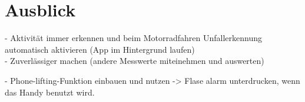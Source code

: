 \chapter{Ausblick}
- Aktivität immer erkennen und beim Motorradfahren Unfallerkennung automatisch aktivieren (App im Hintergrund laufen)\\

- Zuverlässiger machen (andere Messwerte miteinehmen und auswerten)

- Phone-lifting-Funktion einbauen und nutzen -> Flase alarm unterdrucken, wenn das Handy benutzt wird.